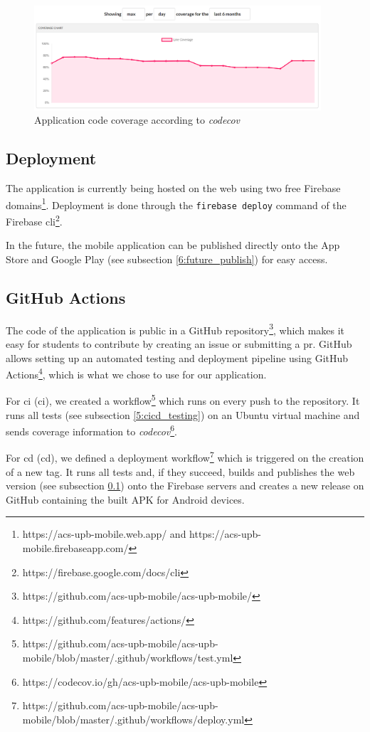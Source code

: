 \begin{figure}[!ht]
    \centering
     \includegraphics[width=0.95\textwidth]{figures/charts/codecov.png}
     \caption{Application code coverage according to \textit{codecov}}
    \label{5:fig:codecov}
\end{figure}

\subsection{Deployment} \label{5:cicd_deployment}
The application is currently being hosted on the web using two free Firebase domains\footnote{https://acs-upb-mobile.web.app/ and https://acs-upb-mobile.firebaseapp.com/}. Deployment is done through the \texttt{firebase deploy} command of the Firebase \acrshort{cli}\footnote{https://firebase.google.com/docs/cli}.

In the future, the mobile application can be published directly onto the App Store and Google Play (see subsection \ref{6:future_publish}) for easy access.

\subsection{GitHub Actions} \label{5:cicd_actions}

The code of the application is public in a GitHub repository\footnote{https://github.com/acs-upb-mobile/acs-upb-mobile/}, which makes it easy for students to contribute by creating an issue or submitting a \acrshort{pr}. GitHub allows setting up an automated testing and deployment pipeline using GitHub Actions\footnote{https://github.com/features/actions/}, which is what we chose to use for our application.

For \acrlong{ci} (\acrshort{ci}), we created a workflow\footnote{https://github.com/acs-upb-mobile/acs-upb-mobile/blob/master/.github/workflows/test.yml} which runs on every push to the repository. It runs all tests (see subsection \ref{5:cicd_testing}) on an Ubuntu virtual machine and sends coverage information to \textit{codecov}\footnote{https://codecov.io/gh/acs-upb-mobile/acs-upb-mobile}. 

For \acrlong{cd} (\acrshort{cd}), we defined a deployment workflow\footnote{https://github.com/acs-upb-mobile/acs-upb-mobile/blob/master/.github/workflows/deploy.yml} which is triggered on the creation of a new tag. It runs all tests and, if they succeed, builds and publishes the web version (see subsection \ref{5:cicd_deployment}) onto the Firebase servers and creates a new release on GitHub containing the built APK for Android devices.
